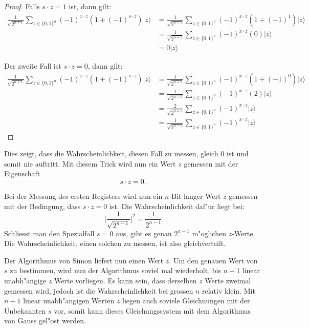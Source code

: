 \begin{refsection}
\begin{proof}
Falls $s \cdot z = 1$ ist, dann gilt:
\begin{align*}
    \frac1{\sqrt{2^{n + 1}}}
      \sum_{z \in \{0,1\}^n}  { (-1)^{x \cdot z} ( 1 + (-1)^{ s \cdot z}) |z\rangle } 
    &= 
    \frac1{\sqrt{2^{n + 1}}}
      \sum_{z \in \{0,1\}^n}  { (-1)^{x \cdot z} ( 1 + (-1)^1) |z\rangle } 
    \\
    &= 
    \frac1{\sqrt{2^{n + 1}}}
      \sum_{z \in \{0,1\}^n}  { (-1)^{x \cdot z} (0) |z\rangle } 
    \\
    &=
    0 |z\rangle
\end{align*}

Der zweite Fall ist $s \cdot z = 0$, dann gilt:
\begin{align*}
    \frac1{\sqrt{2^{n + 1}}}
      \sum_{z \in \{0,1\}^n}  { (-1)^{x \cdot z} ( 1 + (-1)^{ s \cdot z}) |z\rangle } 
    &= 
    \frac1{\sqrt{2^{n + 1}}}
      \sum_{z \in \{0,1\}^n}  { (-1)^{x \cdot z} ( 1 + (-1)^0) |z\rangle } 
    \\
    &= 
    \frac1{\sqrt{2^{n + 1}}}
      \sum_{z \in \{0,1\}^n}  { (-1)^{x \cdot z} (2) |z\rangle } 
    \\
    &= 
    \frac{2}{\sqrt{2^{n + 1}}} 
      \sum_{z \in \{0,1\}^n}  { (-1)^{x \cdot z}|z\rangle } 
    \\
    &= 
    \frac1{\sqrt{2^{n - 1}}} 
      \sum_{z \in \{0,1\}^n}  { (-1)^{x \cdot z}|z\rangle } 
\end{align*}
\end{proof}
Dies zeigt, dass die Wahrscheinlichkeit, diesen Fall zu messen, gleich 0 ist und
somit nie auftritt. 
Mit diesem Trick wird nun ein Wert $z$ gemessen mit der Eigenschaft
\[
    s \cdot z = 0.
\]

Bei der Messung des ersten Registers wird nun ein $n$-Bit langer Wert $z$
gemessen mit der Bedingung, dass $s \cdot z = 0$ ist. Die Wahrscheinlichkeit
daf"ur liegt bei:
\[
    \biggl|\frac1{\sqrt{2^{n - 1}}}\biggr|^2 = \frac1{2^{n-1}}
\]
Schliesst man den Spezialfall $s = 0$ aus, gibt es genau $2^{n-1}$
m"oglichen $z$-Werte.  Die Wahrscheinlichkeit, einen solchen zu messen, ist also
gleichverteilt.

Der Algorithmus von Simon liefert nun einen Wert $z$. Um den genauen Wert von
$s$ zu bestimmen, wird nun der Algorithmus soviel mal wiederholt, bis $n-1$
linear unabh"angige $z$ Werte vorliegen. Es kann sein, dass derselben $z$ Werte
zweimal gemessen wird, jedoch ist die Wahrscheinlichkeit bei grossen $n$
relativ klein.  Mit $n-1$ linear unabh"angigen Werten $z$ liegen auch soviele
Gleichnungen mit der Unbekannten $s$ vor, somit kann dieses Gleichungssystem mit
dem Algorithmus von Gauss gel"ost werden.


\end{refsection}
